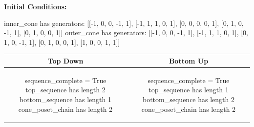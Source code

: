 \documentclass[10pt]{article}
\begin{document}
\textbf{Initial Conditions:}
\begin{SAGE}
inner_cone has generators: 
[[-1, 0, 0, -1, 1], [-1, 1, 1, 0, 1], [0, 0, 0, 0, 1], [0, 1, 0, -1, 1], [0, 1, 0, 0, 1]]
outer_cone has generators: 
[[-1, 0, 0, -1, 1], [-1, 1, 1, 0, 1], [0, 1, 0, -1, 1], [0, 1, 0, 0, 1], [1, 0, 0, 1, 1]]

\end{SAGE}
\begin{tabular}{c|c}
\textbf{Top Down} & \textbf{Bottom Up} \\ \hline  
\begin{SAGE}
sequence_complete = True
top_sequence has length 2
bottom_sequence has length 1
cone_poset_chain has length 2
\end{SAGE} 
&
\begin{SAGE}
sequence_complete = True
top_sequence has length 1
bottom_sequence has length 2
cone_poset_chain has length 2
\end{SAGE} 
\\ \hline


\end{tabular}
\end{document}
